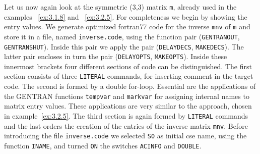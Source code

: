 \example\label{ex:8.2}

Let us now again look at the symmetric (3,3) matrix {\tt m}, already used in
the examples ~\ref{ex:3.1.8} and ~\ref{ex:3.2.5}. For completeness we begin
by showing the entry values. We generate optimized fortran77 code
for the inverse {\tt mnv} of {\tt m} and store it in a file, 
named {\tt inverse.code}, using the function pair ({\tt GENTRANOUT}, 
{\tt GENTRANSHUT}). Inside this pair we apply the pair ({\tt DELAYDECS},
{\tt MAKEDECS}). The latter pair encloses in turn the pair ({\tt DELAYOPTS},
{\tt MAKEOPTS}). Inside these innermost brackets four different sections of 
code can be distinguished. The first section consists of three {\tt LITERAL} 
commands, for inserting comment in the target code. The second is formed by
a double for-loop.  Essential are the applications of the GENTRAN functions
{\tt tempvar} and {\tt markvar} for assigning internal names to matrix entry
values. These applications are very similar to the approach, chosen in
example~\ref{ex:3.2.5}. The third section is again formed by {\tt LITERAL}
commands and the last orders the creation of the entries of the inverse
matrix {\tt mnv}. Before introducing the file {\tt inverse.code} we selected
{\tt S0} as initial cse name, using the function {\tt INAME}, and 
turned {\tt ON} the switches {\tt ACINFO} and {\tt DOUBLE}.

